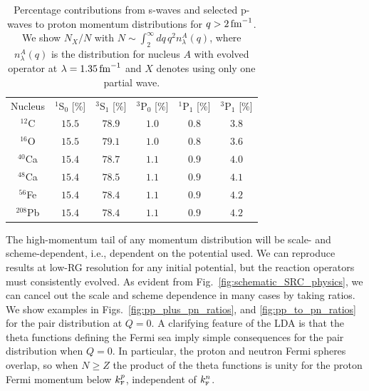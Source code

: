 \documentclass[10pt,aps,prc,floatfix,twocolumn,nofootinbib]{revtex4-1}
\begin{document}
\begin{table}[htb]
	\caption{Percentage contributions from s-waves and selected p-waves to proton momentum distributions for $q>2\,\mbox{fm}^{-1}$. We show $N_X/N$ with $N \sim \int_2^{\infty} dq\, q^2 n_{\lambda}^A(q)$, where $n_{\lambda}^A(q)$ is the distribution for nucleus $A$ with evolved operator at $\lambda = 1.35\,\mbox{fm}^{-1}$ and $X$ denotes using only one partial wave.}
	\label{tab:partial_wave_contributions}
	\begin{ruledtabular}
		\begin{tabular}{c|ccccc}
		   Nucleus & $^{1}$S$_0$ [\%] & $^{3}$S$_1$ [\%] & $^{3}$P$_0$ [\%] & $^{1}$P$_1$ [\%] & $^{3}$P$_1$ [\%]
		   \mystrut\\
			\colrule
      			$^{12}$C & $15.5$ & $78.9$ & $1.0$ &
      			$0.8$ & $3.8$
                    \mystrut\\
      			$^{16}$O & $15.5$ & $79.1$ & $1.0$ &
      			$0.8$ & $3.6$
                    \mystrut\\
      			$^{40}$Ca & $15.4$ & $78.7$ & $1.1$ &
      			$0.9$ & $4.0$
                    \mystrut\\
      			$^{48}$Ca & $15.4$ & $78.5$ & $1.1$ &
      			$0.9$ & $4.1$
                    \mystrut\\
      			$^{56}$Fe & $15.4$ & $78.4$ & $1.1$ &
      			$0.9$ & $4.2$
                    \mystrut\\
      			$^{208}$Pb & $15.4$ & $78.4$ & $1.1$ &
      			$0.9$ & $4.2$
                    \mystrut
		\end{tabular}
  	\end{ruledtabular}
\end{table}

The high-momentum tail of any momentum distribution will be scale- and scheme-dependent, i.e., dependent on the potential used. 
We can reproduce results at low-RG resolution for any initial potential, but the reaction operators must consistently evolved.
As evident from Fig.~\ref{fig:schematic_SRC_physics}, we can cancel out the scale and scheme dependence in many cases by taking ratios.
We show examples in Figs.~\ref{fig:pp_plus_pn_ratios}, and \ref{fig:pp_to_pn_ratios} for the pair distribution at $Q=0$.
A clarifying feature of the LDA is that the theta functions defining the Fermi sea imply simple consequences for the pair distribution when $Q=0$.
In particular, the proton and neutron Fermi spheres overlap, so when $N \geq Z$ the product of the theta functions  is unity for the proton Fermi momentum below $k_{\scriptscriptstyle{\text F}}^p$, independent of $k_{\scriptscriptstyle{\text F}}^n$.
\end{document}
